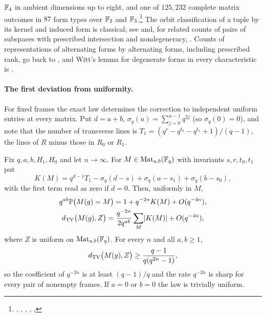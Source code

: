 $\mathbb{F}_4$ in ambient dimensions up to eight, and one of $125{,}232$ complete
matrix outcomes in $87$ form types over $\mathbb{F}_2$ and
$\mathbb{F}_3$.\footnote{\raggedright{},
,
,
,
,
}
The orbit classification of a tuple by its kernel and induced form is
classical; see \cite[Lemma~2.6]{GuralnickLarsenTiep2024Character} and, for
related counts of pairs of subspaces with prescribed intersection and
nondegeneracy, \cite{DeBoeckVandeVoorde2024Anzahl}. Counts of
representations of alternating forms by alternating forms, including
prescribed rank, go back to \cite{Wan1995Representations,WeiZhang2001Number},
and Witt's lemma for degenerate forms in every characteristic is
\cite[Theorem~3.4]{SprehnWahl2020Forms}.

\paragraph{The first deviation from uniformity.}
For fixed frames the exact law determines the correction to independent
uniform entries at every matrix. Put $d=a+b$, $\sigma_q(u)=\sum_{j=0}^{u-1}q^{2j}$
(so $\sigma_q(0)=0$), and note that the number of transverse lines is
$T_1=(q^r-q^{t_0}-q^{t_1}+1)/(q-1)$, the lines of $R$ minus those in $R_0$ or
$R_1$.

\begin{theorem}\label{spn:thm:first-correction}
Fix $q,a,b,H_1,H_0$ and let $n\to\infty$. For $M\in\operatorname{Mat}_{a,b}(\mathbb{F}_q)$ with
invariants $s,r,t_0,t_1$ put
\[
 K(M)=q^{d-1}T_1-\sigma_q(d-s)+\sigma_q(a-s_1)+\sigma_q(b-s_0),
\]
with the first term read as zero if $d=0$. Then, uniformly in $M$,
\begin{gather*}
 q^{ab}\mathbb{P}\bigl(M(g)=M\bigr)=1+q^{-2n}K(M)+O(q^{-4n}),\\
 d_{\mathrm{TV}}\bigl(M(g),Z\bigr)=\frac{q^{-2n}}{2q^{ab}}\sum_M\lvert K(M)\rvert+O(q^{-4n}),
\end{gather*}
where $Z$ is uniform on $\operatorname{Mat}_{a,b}(\mathbb{F}_q)$. For every $n$ and all $a,b\ge1$,
\begin{equation}\label{spn:eq:scalar-lower}
 d_{\mathrm{TV}}\bigl(M(g),Z\bigr)\ge\frac{q-1}{q(q^{2n}-1)} ,
\end{equation}
so the coefficient of $q^{-2n}$ is at least $(q-1)/q$ and the rate $q^{-2n}$
is sharp for every pair of nonempty frames. If $a=0$ or $b=0$ the law is
trivially uniform.
\end{theorem}

